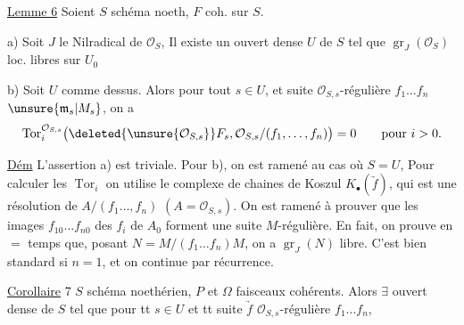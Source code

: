\uline{Lemme 6} \quad Soient $S$ schéma   noeth, $F$  coh. sur $S$.

a) Soit $J$ le Nilradical de $\mathcal O_S$,  Il existe un ouvert dense $U$ de $S$ tel que  $\operatorname{gr}_J(\mathcal O_S)$  loc. libres sur $U_0$

b) Soit $U$ comme dessus. Alors pour tout $s\in U$, et  suite $\mathcal O_{S,s}$-régulière $f_1\ldots f_n$  $\unsure{\mathfrak m_s|M_s}$,  on a
\[
\operatorname{Tor}^{\mathcal O_{S,s}}_i\bigl(\deleted{\unsure{\mathcal O_{S,s}}}F_s,\mathcal O_{S,s}/(f_1,\ldots,f_n)\bigr)=0\qquad\text{pour }i>0.
\]

\uline{Dém} L'assertion a) est triviale. Pour b), on est ramené au cas où $S=U$,   Pour calculer les $\operatorname{Tor}_i$ on utilise le complexe de chaines de Koszul $K_{\bullet}(\underrightarrow f)$, qui est une résolution de $A/(f_1\ldots,f_n)$ $(A=\mathcal O_{S,s})$. On est ramené à prouver que les images $f_{10}\ldots f_{n0}$ des $f_i$ de $A_0$ forment   une suite $M$-régulière. En fait, on prouve en $=$ temps que, posant $N=M/(f_1\ldots f_n)M$, on a $\operatorname{gr}_J(N)$  libre. C'est bien standard si $n=1$, et on continue par récurrence.

\uline{Corollaire} 7 \quad $S$ schéma noethérien, $P$ et $\Omega$ faisceaux cohérents. Alors $\exists$ ouvert dense  de $S$ tel que pour tt $s\in U$ et tt suite $\underrightarrow f$ $\mathcal O_{S,s}$-régulière $f_1\ldots f_n$,


